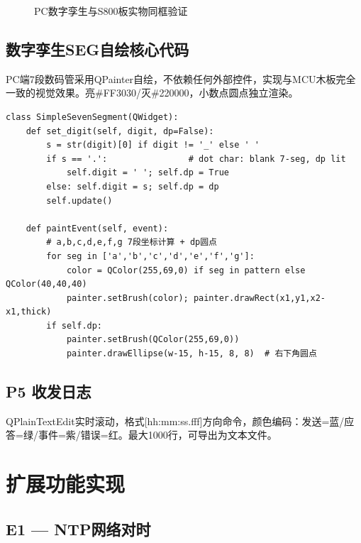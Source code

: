 \documentclass[12pt,hyperref,a4paper,UTF8]{ctexart}
\begin{document}
\begin{figure}[!htbp]
    \centering
    \caption{PC数字孪生与S800板实物同框验证}
    \label{fig:twin}
\end{figure}

\subsection{数字孪生SEG自绘核心代码}

PC端7段数码管采用QPainter自绘，不依赖任何外部控件，实现与MCU木板完全一致的视觉效果。亮\#FF3030/灭\#220000，小数点圆点独立渲染。

\begin{verbatim}
class SimpleSevenSegment(QWidget):
    def set_digit(self, digit, dp=False):
        s = str(digit)[0] if digit != '_' else ' '
        if s == '.':                # dot char: blank 7-seg, dp lit
            self.digit = ' '; self.dp = True
        else: self.digit = s; self.dp = dp
        self.update()

    def paintEvent(self, event):
        # a,b,c,d,e,f,g 7段坐标计算 + dp圆点
        for seg in ['a','b','c','d','e','f','g']:
            color = QColor(255,69,0) if seg in pattern else QColor(40,40,40)
            painter.setBrush(color); painter.drawRect(x1,y1,x2-x1,thick)
        if self.dp:
            painter.setBrush(QColor(255,69,0))
            painter.drawEllipse(w-15, h-15, 8, 8)  # 右下角圆点
\end{verbatim}

\subsection{P5 收发日志}

QPlainTextEdit实时滚动，格式[hh:mm:ss.fff]方向命令，颜色编码：发送=蓝/应答=绿/事件=紫/错误=红。最大1000行，可导出为文本文件。

\section{扩展功能实现}

\subsection{E1 — NTP网络对时}
\end{document}
